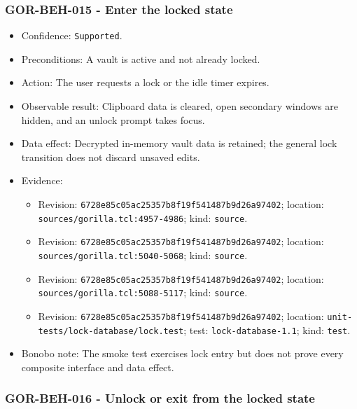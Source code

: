 \documentclass[
  letterpaper,
]{article}
\newcommand{\passthrough}[1]{#1}
\providecommand{\tightlist}{%
  \setlength{\itemsep}{0pt}\setlength{\parskip}{0pt}}
\begin{document}
\subsubsection{GOR-BEH-015 - Enter the locked state}\label{gor-beh-015---enter-the-locked-state}

\begin{itemize}
\tightlist
\item
  Confidence: \passthrough{\lstinline!Supported!}.
\item
  Preconditions: A vault is active and not already locked.
\item
  Action: The user requests a lock or the idle timer expires.
\item
  Observable result: Clipboard data is cleared, open secondary windows are hidden, and an unlock prompt takes focus.
\item
  Data effect: Decrypted in-memory vault data is retained; the general lock transition does not discard unsaved edits.
\item
  Evidence:

  \begin{itemize}
  \tightlist
  \item
    Revision: \nolinkurl{6728e85c05ac25357b8f19f541487b9d26a97402}; location: \nolinkurl{sources/gorilla.tcl:4957-4986};
    kind: \passthrough{\lstinline!source!}.
  \item
    Revision: \nolinkurl{6728e85c05ac25357b8f19f541487b9d26a97402}; location: \nolinkurl{sources/gorilla.tcl:5040-5068};
    kind: \passthrough{\lstinline!source!}.
  \item
    Revision: \nolinkurl{6728e85c05ac25357b8f19f541487b9d26a97402}; location: \nolinkurl{sources/gorilla.tcl:5088-5117};
    kind: \passthrough{\lstinline!source!}.
  \item
    Revision: \nolinkurl{6728e85c05ac25357b8f19f541487b9d26a97402}; location:
    \nolinkurl{unit-tests/lock-database/lock.test}; test: \nolinkurl{lock-database-1.1}; kind:
    \passthrough{\lstinline!test!}.
  \end{itemize}
\item
  Bonobo note: The smoke test exercises lock entry but does not prove every composite interface and data effect.
\end{itemize}

\subsubsection{GOR-BEH-016 - Unlock or exit from the locked
state}\label{gor-beh-016---unlock-or-exit-from-the-locked-state}
\end{document}
